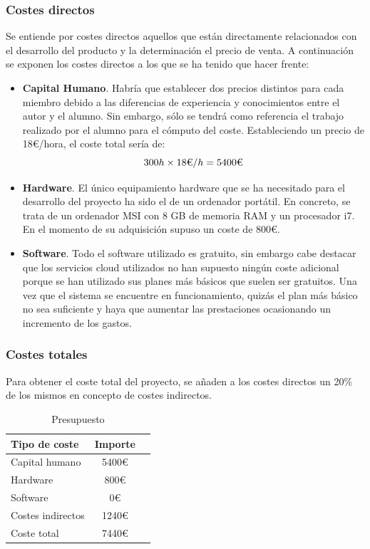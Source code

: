 \subsubsection{Costes directos}

Se entiende por costes directos aquellos que están directamente relacionados con el desarrollo del producto y la determinación el precio de venta. A continuación se exponen los costes directos a los que se ha tenido que hacer frente:

\begin{itemize}
    \item \textbf{Capital Humano}. Habría que establecer dos precios distintos para cada miembro debido a las diferencias de experiencia y conocimientos entre el autor y el alumno. Sin embargo, sólo se tendrá como referencia el trabajo realizado por el alumno para el cómputo del coste. Estableciendo un precio de 18€/hora, el coste total sería de:
    \begin{equation}
        300h \times 18\textup{€}/h = 5400\textup{€}
    \end{equation}
    \item \textbf{Hardware}. El único equipamiento hardware que se ha necesitado para el desarrollo del proyecto ha sido el de un ordenador portátil. En concreto, se trata de un ordenador MSI con 8 GB de memoria RAM y un procesador i7. En el momento de su adquisición supuso un coste de 800€.
    \item \textbf{Software}. Todo el software utilizado es gratuito, sin embargo cabe destacar que los servicios cloud utilizados no han supuesto ningún coste adicional porque se han utilizado sus planes más básicos que suelen ser gratuitos. Una vez que el sistema se encuentre en funcionamiento, quizás el plan más básico no sea suficiente y haya que aumentar las prestaciones ocasionando un incremento de los gastos.
\end{itemize}

\subsubsection{Costes totales}

Para obtener el coste total del proyecto, se añaden a los costes directos un 20\% de los mismos en concepto de costes indirectos.

\begin{table} [htbp]
	\centering
	\begin{tabular}{l c c}
		\textbf{Tipo de coste} & \textbf{Importe}\\ \hline
         Capital humano & 5400€ \\
         Hardware & 800€ \\
         Software & 0€ \\
         Costes indirectos & 1240€ \\
         \hline
         Coste total & 7440€ \\ 
	\end{tabular}
	\centering
	\caption{\label{tab:presupuesto}Presupuesto}
\end{table}

